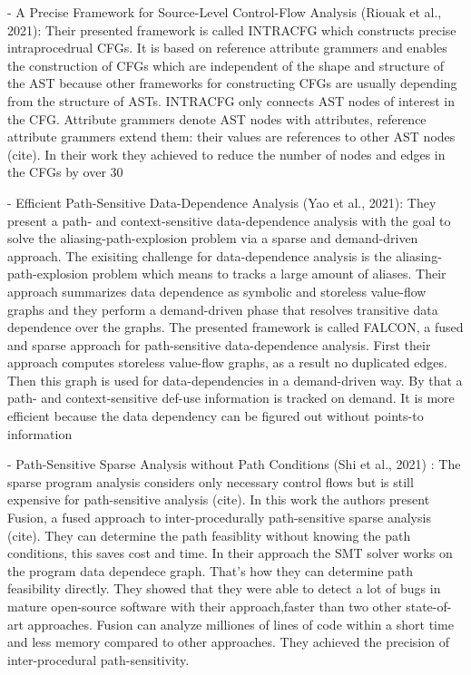 -  A Precise Framework for Source-Level Control-Flow Analysis (Riouak et al., 2021):  Their presented framework is called INTRACFG which constructs precise intraprocedrual CFGs. It is based on reference 
attribute grammers and enables the construction of CFGs which are independent of the shape and structure of the AST because other frameworks for constructing CFGs are usually depending from the structure of ASTs. 
INTRACFG only connects AST nodes of interest in the CFG. Attribute grammers denote AST nodes with attributes, reference attribute grammers extend them: their values are references to other AST nodes (cite). 
In their work they achieved to reduce the number of nodes and edges in the CFGs by over 30%

-  Efficient Path-Sensitive Data-Dependence Analysis (Yao et al., 2021):  They present a path- and context-sensitive data-dependence analysis with the goal to solve the  aliasing-path-explosion problem 
via a sparse and demand-driven approach. The exisiting challenge for data-dependence analysis is the aliasing-path-explosion problem which means to tracks a large amount of aliases. Their approach summarizes 
data dependence as symbolic and storeless value-flow graphs and they perform a demand-driven phase that resolves transitive data dependence over the graphs. The presented framework is called FALCON, a fused and 
sparse approach for path-sensitive data-dependence analysis. First their approach computes storeless value-flow graphs, as a result no duplicated edges. Then this graph is used for data-dependencies in a 
demand-driven way. By that a path- and context-sensitive def-use information is tracked on demand. It is more efficient because the data dependency can be figured out without points-to information 

-  Path-Sensitive Sparse Analysis without Path Conditions (Shi et al., 2021) :  The sparse program analysis considers only necessary control flows but is still expensive for path-sensitive analysis (cite). 
In this work the authors present Fusion, a fused approach to inter-procedurally path-sensitive sparse analysis (cite). They can determine the path feasiblity without knowing the path conditions, 
this saves cost and time. In their approach the SMT solver works on the program data dependece graph. That's how they can determine path feasibility directly.
They showed that they were able to detect a lot of bugs in mature open-source software with their approach,faster than two other state-of-art approaches. Fusion can analyze milliones of lines of code within a 
short time and less memory compared to other approaches. They achieved the precision of inter-procedural path-sensitivity.
